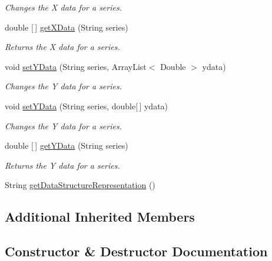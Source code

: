 \begin{DoxyCompactItemize}
\begin{DoxyCompactList}\small\item\em Changes the X data for a series. \end{DoxyCompactList}\item 
double \mbox{[}$\,$\mbox{]} \hyperlink{classbridges_1_1base_1_1_line_chart_a34ef6ace0633d287a78d0e224f38f2ed}{get\+X\+Data} (String series)
\begin{DoxyCompactList}\small\item\em Returns the X data for a series. \end{DoxyCompactList}\item 
void \hyperlink{classbridges_1_1base_1_1_line_chart_a3076dc99debb599529169de40815aba2}{set\+Y\+Data} (String series, Array\+List$<$ Double $>$ ydata)
\begin{DoxyCompactList}\small\item\em Changes the Y data for a series. \end{DoxyCompactList}\item 
void \hyperlink{classbridges_1_1base_1_1_line_chart_aa8094fad197ae35d93f9feab5de91f59}{set\+Y\+Data} (String series, double\mbox{[}$\,$\mbox{]} ydata)
\begin{DoxyCompactList}\small\item\em Changes the Y data for a series. \end{DoxyCompactList}\item 
double \mbox{[}$\,$\mbox{]} \hyperlink{classbridges_1_1base_1_1_line_chart_a2bf257f45c1056808b41581af1f83645}{get\+Y\+Data} (String series)
\begin{DoxyCompactList}\small\item\em Returns the Y data for a series. \end{DoxyCompactList}\item 
String \hyperlink{classbridges_1_1base_1_1_line_chart_a1d481880dc94fc8c2dfdcf64d2de2a3b}{get\+Data\+Structure\+Representation} ()
\end{DoxyCompactItemize}
\subsection*{Additional Inherited Members}


\subsection{Constructor \& Destructor Documentation}
\mbox{\label{classbridges_1_1base_1_1_line_chart_ae864fe5ae85e80ae2f035471fb216e68}} 
